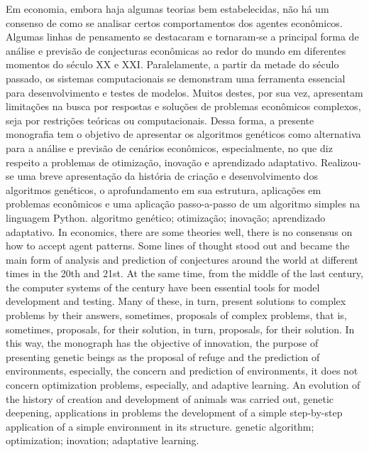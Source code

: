 \resumo
	{%
		Em economia, embora haja algumas teorias bem estabelecidas, não há um consenso de como se analisar certos comportamentos dos agentes econômicos. Algumas linhas de pensamento se destacaram e tornaram-se a principal forma de análise e previsão de conjecturas econômicas ao redor do mundo em diferentes momentos do século XX e XXI. Paralelamente, a partir da metade do século passado, os sistemas computacionais se demonstram uma ferramenta essencial para desenvolvimento e testes de modelos. Muitos destes, por sua vez, apresentam limitações na busca por respostas e soluções de problemas econômicos complexos, seja por restrições teóricas ou computacionais. Dessa forma, a presente monografia tem o objetivo de apresentar os algoritmos genéticos como alternativa para a análise e previsão de cenários econômicos, especialmente, no que diz respeito a problemas de otimização, inovação e aprendizado adaptativo. Realizou-se uma breve apresentação da história de criação e desenvolvimento dos algoritmos genéticos, o aprofundamento em sua estrutura, aplicações em problemas econômicos e uma aplicação passo-a-passo de um algoritmo simples na linguagem Python.
	}
	{algoritmo genético; otimização; inovação; aprendizado adaptativo.}
	{%
		In economics, there are some theories well, there is no consensus on how to accept agent patterns. Some lines of thought stood out and became the main form of analysis and prediction of conjectures around the world at different times in the 20th and 21st. At the same time, from the middle of the last century, the computer systems of the century have been essential tools for model development and testing. Many of these, in turn, present solutions to complex problems by their answers, sometimes, proposals of complex problems, that is, sometimes, proposals, for their solution, in turn, proposals, for their solution. In this way, the monograph has the objective of innovation, the purpose of presenting genetic beings as the proposal of refuge and the prediction of environments, especially, the concern and prediction of environments, it does not concern optimization problems, especially, and adaptive learning. An evolution of the history of creation and development of animals was carried out, genetic deepening, applications in problems the development of a simple step-by-step application of a simple environment in its structure.
	}
	{genetic algorithm; optimization; inovation; adaptative learning.}


